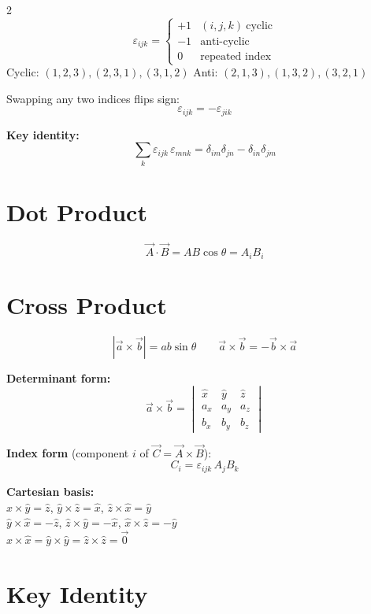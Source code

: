 \documentclass[9pt,a4paper]{article}
\begin{document}
\begin{multicols}{2}
\[
  \varepsilon_{ijk} = \begin{cases}
    +1 & (i,j,k)\ \text{cyclic} \\
    -1 & \text{anti-cyclic} \\
    0  & \text{repeated index}
  \end{cases}
\]
Cyclic: $(1,2,3),(2,3,1),(3,1,2)$ \quad Anti: $(2,1,3),(1,3,2),(3,2,1)$

Swapping any two indices flips sign:
\[
  \varepsilon_{ijk} = -\varepsilon_{jik}
\]

\textbf{Key identity:}
\[
  \sum_k \varepsilon_{ijk}\,\varepsilon_{mnk} = \delta_{im}\delta_{jn} - \delta_{in}\delta_{jm}
\]

\section{Dot Product}

\[
  \vec{A}\cdot\vec{B} = AB\cos\theta = A_iB_i
\]

\section{Cross Product}

\[
  |\vec{a}\times\vec{b}| = ab\sin\theta
  \qquad
  \vec{a}\times\vec{b} = -\vec{b}\times\vec{a}
\]

\textbf{Determinant form:}
\[
  \vec{a}\times\vec{b} =
  \begin{vmatrix}
    \hat{x} & \hat{y} & \hat{z} \\
    a_x & a_y & a_z \\
    b_x & b_y & b_z
  \end{vmatrix}
\]

\textbf{Index form} (component $i$ of $\vec{C}=\vec{A}\times\vec{B}$):
\[
  C_i = \varepsilon_{ijk}\,A_jB_k
\]

\textbf{Cartesian basis:}\\[2pt]
$\hat{x}\times\hat{y}=\hat{z}$,\quad
$\hat{y}\times\hat{z}=\hat{x}$,\quad
$\hat{z}\times\hat{x}=\hat{y}$\\[1pt]
$\hat{y}\times\hat{x}=-\hat{z}$,\quad
$\hat{z}\times\hat{y}=-\hat{x}$,\quad
$\hat{x}\times\hat{z}=-\hat{y}$\\[1pt]
$\hat{x}\times\hat{x}=\hat{y}\times\hat{y}=\hat{z}\times\hat{z}=\vec{0}$

\section{Key Identity}


\end{multicols}
\end{document}
